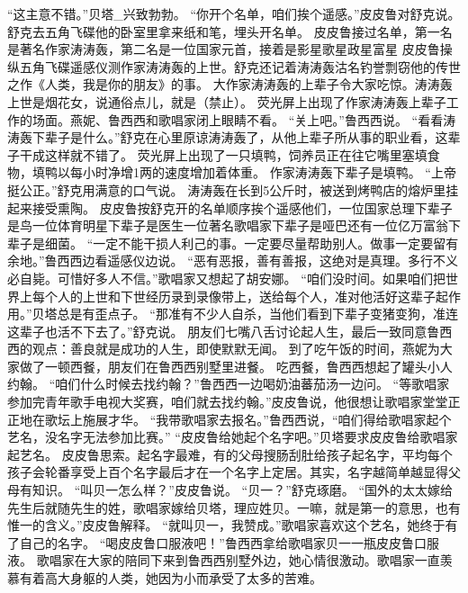 \documentclass[a4paper,12pt,UTF8,twoside]{ctexbook}
\begin{document}
        “这主意不错。”贝塔_兴致勃勃。  
        “你开个名单，咱们挨个遥感。”皮皮鲁对舒克说。        
        舒克去五角飞碟他的卧室里拿来纸和笔，埋头开名单。  
        皮皮鲁接过名单，第一名是著名作家涛涛轰，第二名是一位国家元首，接着是影星歌星政星富星  
        皮皮鲁操纵五角飞碟遥感仪测作家涛涛轰的上世。舒克还记着涛涛轰沽名钓誉剽窃他的传世之作《人类，我是你的朋友》的事。  
        大作家涛涛轰的上辈子令大家吃惊。涛涛轰上世是烟花女，说通俗点儿，就是（禁止）。  
        荧光屏上出现了作家涛涛轰上辈子工作的场面。燕妮、鲁西西和歌唱家闭上眼睛不看。  
        “关上吧。”鲁西西说。  
        “看看涛涛轰下辈子是什么。”舒克在心里原谅涛涛轰了，从他上辈子所从事的职业看，这辈子干成这样就不错了。  
        荧光屏上出现了一只填鸭，饲养员正在往它嘴里塞填食物，填鸭以每小时净增1两的速度增加着体重。  
        作家涛涛轰下辈子是填鸭。  
        “上帝挺公正。”舒克用满意的口气说。  
        涛涛轰在长到5公斤时，被送到烤鸭店的熔炉里挂起来接受熏陶。  
        皮皮鲁按舒克开的名单顺序挨个遥感他们，一位国家总理下辈子是鸟一位体育明星下辈子是医生一位著名歌唱家下辈子是哑巴还有一位亿万富翁下辈子是细菌。  
        “一定不能干损人利己的事。一定要尽量帮助别人。做事一定要留有余地。”鲁西西边看遥感仪边说。  
        “恶有恶报，善有善报，这绝对是真理。多行不义必自毙。可惜好多人不信。”歌唱家又想起了胡安娜。  
        “咱们没时间。如果咱们把世界上每个人的上世和下世经历录到录像带上，送给每个人，准对他活好这辈子起作用。”贝塔总是有歪点子。  
        “那准有不少人自杀，当他们看到下辈子变猪变狗，准连这辈子也活不下去了。”舒克说。  
        朋友们七嘴八舌讨论起人生，最后一致同意鲁西西的观点：善良就是成功的人生，即使默默无闻。  
        到了吃午饭的时间，燕妮为大家做了一顿西餐，朋友们在鲁西西别墅里进餐。  
        吃西餐，鲁西西想起了罐头小人约翰。  
        “咱们什么时候去找约翰？”鲁西西一边喝奶油蕃茄汤一边问。  
        “等歌唱家参加完青年歌手电视大奖赛，咱们就去找约翰。”皮皮鲁说，他很想让歌唱家堂堂正正地在歌坛上施展才华。        
        “我带歌唱家去报名。”鲁西西说，“咱们得给歌唱家起个艺名，没名字无法参加比赛。”  
        “皮皮鲁给她起个名字吧。”贝塔要求皮皮鲁给歌唱家起艺名。  
        皮皮鲁思索。起名字最难，有的父母搜肠刮肚给孩子起名字，平均每个孩子会轮番享受上百个名字最后才在一个名字上定居。其实，名字越简单越显得父母有知识。  
        “叫贝一怎么样？”皮皮鲁说。  
        “贝一？”舒克琢磨。  
        “国外的太太嫁给先生后就随先生的姓，歌唱家嫁给贝塔，理应姓贝。一嘛，就是第一的意思，也有惟一的含义。”皮皮鲁解释。  
        “就叫贝一，我赞成。”歌唱家喜欢这个艺名，她终于有了自己的名字。  
        “喝皮皮鲁口服液吧！”鲁西西拿给歌唱家贝一一瓶皮皮鲁口服液。  
        歌唱家在大家的陪同下来到鲁西西别墅外边，她心情很激动。歌唱家一直羡慕有着高大身躯的人类，她因为小而承受了太多的苦难。  
\end{document}
